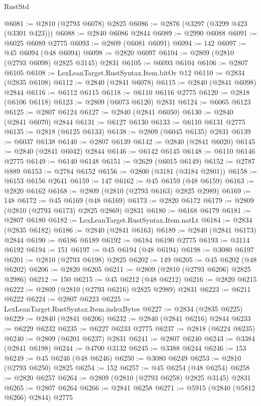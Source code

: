 \begin{lexlean}{RustStd}
\begin{coremodule}
@6081 := @2810 (@2793 @6078) @2825
@6086 := @2876 (@3297 (@3299 @423 (@3301 @423)))
@6088 := @2840 @6086 @2844
@6089 := @2990 @6088
@6091 := @6025 @6089 @2775
@6093 := @2809 (@6081 @6091)
@6094 := 142
@6097 := @45 @6094 (@48 @6094)
@6098 := @2820 @6097
@6104 := @2809 (@2810 (@2793 @6098) @2825 @3145) @2831
@6105 := @6093 @6104
@6106 := @2807 @6105
@6108 := LexLeanTarget.RustSyntax.Item.bitOr @12
@6110 := @2834 (@2835 @6108)
@6112 := @2840 (@2841 @6078)
@6115 := @2840 (@2841 @6098) @2844
@6116 := @6112 @6115
@6118 := @6110 @6116 @2775
@6120 := @2818 (@6106 @6118)
@6123 := @2809 (@6073 @6120) @2831
@6124 := @6065 @6123
@6125 := @2807 @6124
@6127 := @2840 (@2841 @6050)
@6130 := @2840 (@2841 @6070) @2844
@6131 := @6127 @6130
@6133 := @6110 @6131 @2775
@6135 := @2818 (@6125 @6133)
@6138 := @2809 (@6045 @6135) @2831
@6139 := @6037 @6138
@6140 := @2807 @6139
@6142 := @2840 (@2841 @6020)
@6145 := @2840 (@2841 @6042) @2844
@6146 := @6142 @6145
@6148 := @6110 @6146 @2775
@6149 := @6140 @6148
@6151 := @2629 (@6015 @6149)
@6152 := @2787 @889
@6153 := @2784 @6152
@6156 := @2800 (@3181 (@3184 @2801))
@6158 := @6153 @6156 @2641
@6159 := 147
@6162 := @45 @6159 (@48 @6159)
@6163 := @2820 @6162
@6168 := @2809 (@2810 (@2793 @6163) @2825 @2989)
@6169 := 148
@6172 := @45 @6169 (@48 @6169)
@6173 := @2820 @6172
@6179 := @2809 (@2810 (@2793 @6173) @2825 @2869) @2831
@6180 := @6168 @6179
@6181 := @2807 @6180
@6182 := LexLeanTarget.RustSyntax.Item.natLt
@6184 := @2834 (@2835 @6182)
@6186 := @2840 (@2841 @6163)
@6189 := @2840 (@2841 @6173) @2844
@6190 := @6186 @6189
@6192 := @6184 @6190 @2775
@6193 := @3114 @6192
@6194 := 151
@6197 := @45 @6194 (@48 @6194)
@6198 := @3080 @6197
@6201 := @2810 (@2793 @6198) @2825
@6202 := 149
@6205 := @45 @6202 (@48 @6202)
@6206 := @2820 @6205
@6211 := @2809 (@2810 (@2793 @6206) @2825 @2986)
@6212 := 150
@6215 := @45 @6212 (@48 @6212)
@6216 := @2820 @6215
@6222 := @2809 (@2810 (@2793 @6216) @2825 @2989) @2831
@6223 := @6211 @6222
@6224 := @2807 @6223
@6225 := LexLeanTarget.RustSyntax.Item.indexBytes
@6227 := @2834 (@2835 @6225)
@6229 := @2840 (@2841 @6206)
@6232 := @2840 (@2841 @6216) @2844
@6233 := @6229 @6232
@6235 := @6227 @6233 @2775
@6237 := @2818 (@6224 @6235)
@6240 := @2809 (@6201 @6237) @2831
@6241 := @2807 @6240
@6243 := @3384 (@2841 @6198)
@6244 := @4700 @3132
@6245 := @3388 @6244
@6246 := 153
@6249 := @45 @6246 (@48 @6246)
@6250 := @3080 @6249
@6253 := @2810 (@2793 @6250) @2825
@6254 := 152
@6257 := @45 @6254 (@48 @6254)
@6258 := @2820 @6257
@6264 := @2809 (@2810 (@2793 @6258) @2825 @3145) @2831
@6265 := @2807 @6264
@6266 := @2841 @6258
@6271 := @5915 (@2840 (@5812 @6266) @2844) @2775

\end{coremodule}
\end{lexlean}
